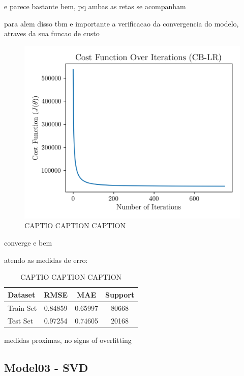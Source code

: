 \documentclass[conference]{IEEEtran}
\begin{document}
e parece bastante bem, pq ambas as retas se acompanham

para alem disso tbm e importante a verificacao da convergencia do modelo, atraves da sua funcao de custo

\begin{figure}[H]
    \centering
    \includegraphics[width=1\linewidth]{assets/model02_cost_function.png}
    \caption{CAPTIO CAPTION CAPTION}
    \label{fig:model02_cost_function}
\end{figure}

converge e bem

atendo as medidas de erro:

\begin{table}[H]
\centering
\caption{CAPTIO CAPTION CAPTION}
\label{tab:model03_results}
\begin{tabular}{lccc}
\toprule
\textbf{Dataset} & \textbf{RMSE} & \textbf{MAE} & \textbf{Support} \\
\midrule
Train Set & 0.84859 & 0.65997 & 80668 \\
Test Set & 0.97254 & 0.74605 & 20168 \\
\bottomrule
\end{tabular}
\end{table}

medidas proximas, no signs of overfitting

\subsection{Model03 - SVD}
\end{document}
